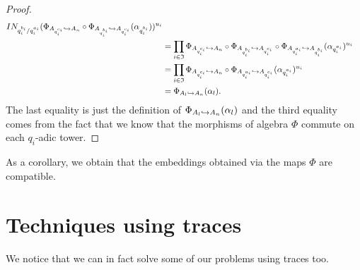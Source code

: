 \documentclass[a4paper,11pt]{article}
\begin{document}
\begin{proof}
\begin{align*}
{  I}N_{q_i^{b_i}/q_i^{a_i}}(\Phi_{A_{q_i^{c_i}}\hookrightarrow
A_n}\circ\Phi_{A_{q_i^{b_i}}\hookrightarrow A_{q_i^{c_i}}}
  (\alpha_{q_i^{b_i}}))^{u_i}\\
&= \prod_{i\in\mathfrak I}\Phi_{A_{q_i^{c_i}}\hookrightarrow
A_n}\circ\Phi_{A_{q_i^{b_i}}\hookrightarrow A_{q_i^{c_i}}}\circ\Phi_{A_{q_i^{a_i}}\hookrightarrow
A_{q_i^{b_i}}}(\alpha_{q_i^{a_i}})^{u_i}\\
&= \prod_{i\in\mathfrak I}\Phi_{A_{q_i^{c_i}}\hookrightarrow
A_n}\circ\Phi_{A_{q_i^{a_i}}\hookrightarrow A_{q_i^{c_i}}}(\alpha_{q_i^{a_i}})^{u_i}\\
&= \Phi_{A_l\hookrightarrow A_n}(\alpha_l).
  \end{align*}
  The last equality is just the definition of $\Phi_{A_l\hookrightarrow A_n}(\alpha_l)$ and
  the third equality comes from the fact that we know that the morphisms of algebra
  $\Phi$ commute on each $q_i$-adic tower.
\end{proof}
As a corollary, we obtain that the embeddings obtained via the maps $\Phi$ are
compatible.
\section{Techniques using traces}
We notice that we can in fact solve some of our problems using traces too.
\end{document}
